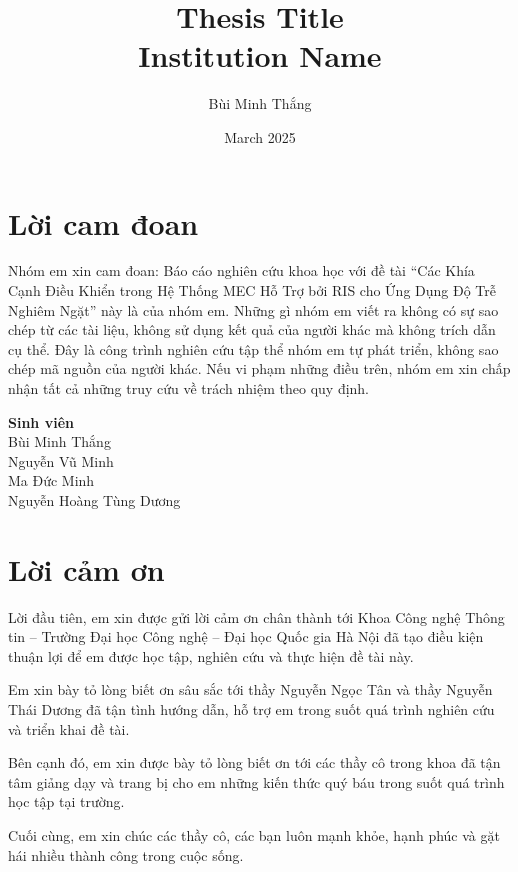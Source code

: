 \documentclass[12pt]{report}
\title{
    {Thesis Title}\\
    {\large Institution Name}\\
}
\author{Bùi Minh Thắng}
\date{March 2025}
\begin{document}




\chapter*{Lời cam đoan}
Nhóm em xin cam đoan: Báo cáo nghiên cứu khoa học với đề tài “Các Khía Cạnh Điều Khiển trong Hệ Thống MEC Hỗ Trợ bởi RIS cho Ứng Dụng Độ Trễ Nghiêm Ngặt” này là của nhóm em. Những gì nhóm em viết ra không có sự sao chép từ các tài liệu, không sử dụng kết quả của người khác mà không trích dẫn cụ thể. Đây là công trình nghiên cứu tập thể nhóm em tự phát triển, không sao chép mã nguồn của người khác. Nếu vi phạm những điều trên, nhóm em xin chấp nhận tất cả những truy cứu về trách nhiệm theo quy định.

\vspace{2cm} %
\noindent
\hfill
\begin{minipage}{0.4\textwidth}
    \centering
    \textbf{Sinh viên}\\[1cm] %
    Bùi Minh Thắng\\
    Nguyễn Vũ Minh\\
    Ma Đức Minh\\
    Nguyễn Hoàng Tùng Dương\\
\end{minipage}

\chapter*{Lời cảm ơn}
Lời đầu tiên, em xin được gửi lời cảm ơn chân thành tới Khoa Công nghệ Thông tin – Trường Đại học Công nghệ – Đại học Quốc gia Hà Nội đã tạo điều kiện thuận lợi để em được học tập, nghiên cứu và thực hiện đề tài này.

Em xin bày tỏ lòng biết ơn sâu sắc tới thầy Nguyễn Ngọc Tân và thầy Nguyễn Thái Dương đã tận tình hướng dẫn, hỗ trợ em trong suốt quá trình nghiên cứu và triển khai đề tài.

Bên cạnh đó, em xin được bày tỏ lòng biết ơn tới các thầy cô trong khoa đã tận tâm giảng dạy và trang bị cho em những kiến thức quý báu trong suốt quá trình học tập tại trường.

Cuối cùng, em xin chúc các thầy cô, các bạn luôn mạnh khỏe, hạnh phúc và gặt hái nhiều thành công trong cuộc sống.
\end{document}
